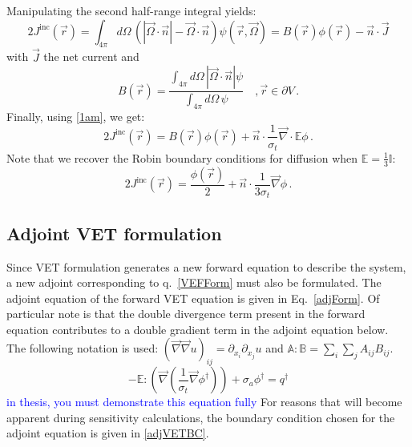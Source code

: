 \documentclass{article}
\newcommand{\vr}{\vec{r}}
\newcommand{\vJ}{\vec{J}}
\newcommand{\vO}{\vec{\Omega}}
\renewcommand{\div}{\vec{\nabla} \cdot}
\newcommand{\grad}{\vec{\nabla}}
\newcommand{\bound}{\partial V}
\newcommand{\vn}{\vec{n}}
\newcommand{\Edd}{\mathbb{E}}
\newcommand{\BEdd}{B}
\newcommand{\sigt}{\sigma_t}
\newcommand{\siga}{\sigma_a}
\newcommand{\scalResp}{q^\dag}
\newcommand{\comment}[2]{\marginpar{\textcolor{#2}{$\star$}}\textcolor{#2}{#1}\newline}
\newcommand{\jcr}[1]{\comment{#1}{blue}}
\newcommand{\jcr}[1]{\phantom{a}}
\begin{document}
Manipulating the second half-range integral yields:
\begin{equation}
2 J^{\text{inc}}(\vr) = \int_{4\pi} d \Omega\,  \left( | \vO \cdot \vn |- \vO\cdot\vn\right)  \psi(\vr,\vO) 
= \BEdd(\vr) \phi(\vr) - \vn \cdot \vJ 
\end{equation}
with $\vJ$ the net current and
\begin{equation}
\BEdd(\vr) = \frac{\int_{4 \pi} d\Omega \, | \vO \cdot \vn | \psi}{\int_{4\pi} d\Omega \, \psi} \quad , \vr \in \bound \,.
\end{equation}
Finally, using \eqref{1am}, we get:
\begin{equation}
2 J^{\text{inc}}(\vr) = \BEdd(\vr) \phi(\vr) + \vn \cdot \frac{1}{\sigt} \div \Edd \phi \,.
\end{equation}
Note that we recover the Robin boundary conditions for diffusion when $\Edd = \tfrac{1}{3} \mathbb{I}$:
\[
2 J^{\text{inc}}(\vr) = \frac{\phi(\vr)}{2} + \vn \cdot \frac{1}{3\sigt} \grad \phi \,.
\]


\subsection{Adjoint VET formulation}

Since VET formulation generates a new forward equation to describe the system, a new adjoint corresponding to q.~\eqref{VEFForm} must also be formulated. The adjoint equation of the forward VET equation is given in Eq.~\eqref{adjForm}. Of particular note is that the double divergence term present in the forward equation contributes to a double gradient term in the adjoint equation below. The following notation is used: $(\grad \grad u)_{ij} = \partial_{x_i} \partial_{x_j} u$
and $\mathbb{A} : \mathbb{B} = \sum_i \sum_j A_{ij}B_{ij}$. 
\begin{equation}
\label{adjForm}
- \Edd : \left( \grad \left( \frac{1}{\sigt}\grad \phi^\dag \right) \right) + \siga \phi^\dag = \scalResp
\end{equation}
\jcr{in thesis, you must demonstrate this equation fully}
For reasons that will become apparent during sensitivity calculations, the boundary condition chosen for the adjoint equation is given in \eqref{adjVETBC}.
\end{document}
